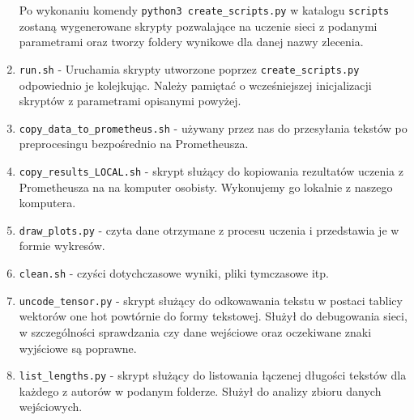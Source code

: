 \begin{enumerate}
	Po wykonaniu komendy \texttt{python3 create\_scripts.py} w katalogu \texttt{scripts} zostaną 
	wygenerowane skrypty pozwalające na uczenie sieci z podanymi parametrami oraz tworzy foldery 
	wynikowe dla danej nazwy zlecenia.
	
	
	
	\item {\texttt{run.sh} } - 
	Uruchamia skrypty utworzone poprzez \texttt{create\_scripts.py} odpowiednio je kolejkując. Należy
	pamiętać o wcześniejszej inicjalizacji skryptów z parametrami opisanymi powyżej.
	
	\item {\texttt{copy\_data\_to\_prometheus.sh} } - używany przez nas do przesyłania tekstów po preprocesingu
	bezpośrednio na Prometheusza. 
	
	\item {\texttt{copy\_results\_LOCAL.sh} } - skrypt służący do kopiowania rezultatów uczenia z Prometheusza na 
	na komputer osobisty. Wykonujemy go lokalnie z naszego komputera. 

	\item {\texttt{draw\_plots.py} } - czyta dane otrzymane z procesu uczenia i przedstawia je w formie wykresów.
	
	\item {\texttt{clean.sh} } - czyści dotychczasowe wyniki, pliki tymczasowe itp.
	
	\item {\texttt{uncode\_tensor.py} } - skrypt służący do odkowawania tekstu w postaci tablicy wektorów one hot powtórnie do 
 	formy tekstowej. Służył do debugowania sieci, w szczególności sprawdzania czy dane wejściowe oraz 
 	oczekiwane znaki wyjściowe są poprawne.
 	
 	\item {\texttt{list\_lengths.py} } - skrypt służący do listowania łączenej długości tekstów dla każdego z autorów
 	w podanym folderze. Służył do analizy zbioru danych wejściowych.
	
	
	
\end{enumerate}



